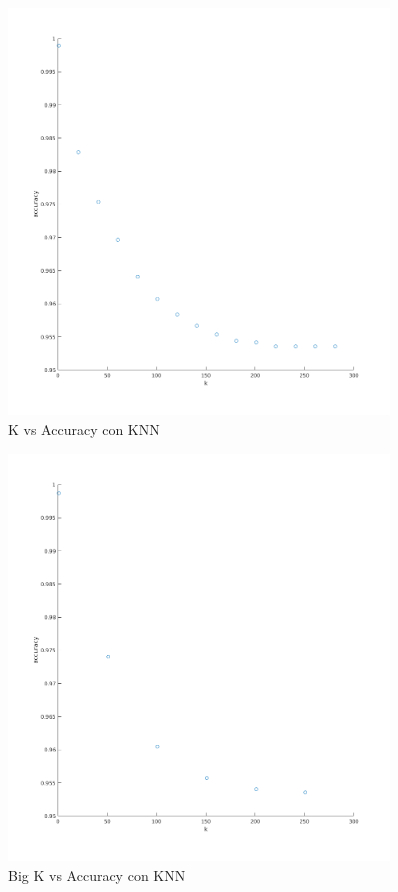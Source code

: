 \begin{figure}[H]
	\centering	\includegraphics[width=0.9\textwidth]{img/k_knn_accu.png}
	\caption{K vs Accuracy con KNN}
	\label{fig:K vs Accuracy con KNN}
\end{figure}
\begin{figure}[H]
	\centering	\includegraphics[width=0.9\textwidth]{img/big_k_knn_accu.png}
	\caption{Big K vs Accuracy con KNN}
	\label{fig:Big K vs Accuracy con KNN}
\end{figure}






